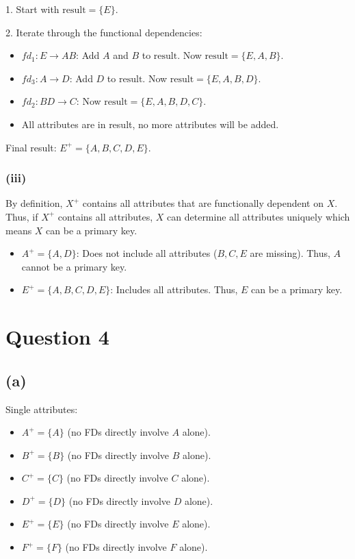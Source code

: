 \documentclass{article}
\begin{document}
1. Start with $ \text{result} = \{E\} $.

2. Iterate through the functional dependencies:
\begin{itemize}
  \item $ fd_1: E \to AB $: Add $ A $ and $ B $ to $ \text{result} $. Now $ \text{result} = \{E, A, B\} $.
  \item $ fd_3: A \to D $: Add $ D $ to $ \text{result} $. Now $ \text{result} = \{E, A, B, D\} $.
  \item $ fd_2: BD \to C $: Now $ \text{result} = \{E, A, B, D, C\} $.
  \item All attributes are in result, no more attributes will be added.
\end{itemize}
Final result: $ E^+ = \{A, B, C, D, E\} $.

\subsubsection*{(iii)}
By definition, $X^+$ contains all attributes that are functionally dependent on $X$. Thus, if $X^+$ contains all attributes, $X$ can determine all attributes uniquely which means $X$ can be a primary key.
\begin{itemize}
  \item $ A^+ = \{A, D\} $: Does not include all attributes ($ B, C, E $ are missing). Thus, $ A $ cannot be a primary key.
  \item $ E^+ = \{A, B, C, D, E\} $: Includes all attributes. Thus, $ E $ can be a primary key.
\end{itemize}

\newpage
\section*{Question 4}
\subsection*{(a)}
Single attributes:
\begin{itemize}
  \item $ A^+ = \{A\} $ (no FDs directly involve $ A $ alone).
  \item $ B^+ = \{B\} $ (no FDs directly involve $ B $ alone).
  \item $ C^+ = \{C\} $ (no FDs directly involve $ C $ alone).
  \item $ D^+ = \{D\} $ (no FDs directly involve $ D $ alone).
  \item $ E^+ = \{E\} $ (no FDs directly involve $ E $ alone).
  \item $ F^+ = \{F\} $ (no FDs directly involve $ F $ alone).
\end{itemize}
\end{document}
